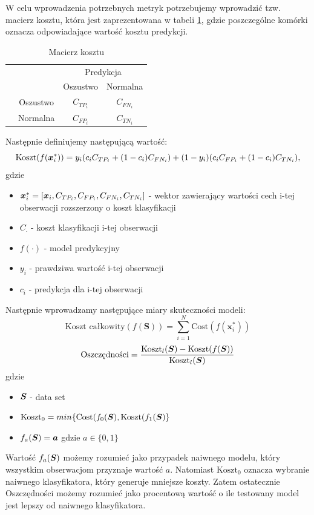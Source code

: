 \documentclass{book}
\begin{document}
	W celu wprowadzenia potrzebnych metryk potrzebujemy wprowadzić tzw. macierz kosztu, która jest zaprezentowana w tabeli \ref{macierz-kosztu}, gdzie poszczególne komórki oznacza odpowiadające wartość kosztu predykcji. 
	\begin{table}[h]
		\begin{center}
			\makegapedcells
			\begin{tabular}{cc|cc}
				\multicolumn{2}{c}{}     &   \multicolumn{2}{c}{Predykcja} \\
				&            &   Oszustwo &   Normalna     \\ 
				\cline{2-4}
				\multirow{2}{*}{\rotatebox[origin=c]{90}{Prawda}} & Oszustwo   & $C_{TP_{i}}$         & $C_{FN_{i}}$              \\
				& Normalna   & $C_{FP_{i}}$         & $C_{TN_{i}}$              \\ 
				\cline{2-4}
			\end{tabular}
		\end{center}
		\caption{Macierz kosztu}
		\label{macierz-kosztu}
	\end{table}
	Następnie definiujemy następującą wartość:
	$$ \text{Koszt}(f(\boldsymbol{x}_{i}^{*})) = y_i (c_i C_{TP_i} + (1-c_i)C_{FN_i}) + (1-y_i)(c_i C_{FP_i} + (1-c_i)C_{TN_i}) \text{,}$$
	gdzie 
	\begin{itemize}
		\item $\boldsymbol{x}_{i}^{*} = [\boldsymbol{x}_i, C_{TP_{i}}, C_{FP_{i}}, C_{FN_{i}}, C_{TN_{i}}]$ - wektor zawierający wartości cech i-tej obserwacji rozszerzony o koszt klasyfikacji
		\item $C_{\cdot}$ - koszt klasyfikacji i-tej obserwacji
		\item $f(\cdot)$ - model predykcyjny
		\item $y_i$ - prawdziwa wartość i-tej obserwacji
		\item $c_i$ - predykcja dla i-tej obserwacji
	\end{itemize}{}
    Następnie wprowadzamy następujące miary skuteczności modeli:
	\begin{equation}
		\label{koszt-calkowity}
		\text{Koszt całkowity}(f(\boldsymbol{S})) = \sum_{i=1}^{N}\text{Cost}(f(\boldsymbol{x}_{i}^{*}))
	\end{equation} 
	\begin{equation}
		\text{Oszczędności} = \frac{\text{Koszt}_{l}(\boldsymbol{S}) - \text{Koszt}(f(\boldsymbol{S}))}{\text{Koszt}_{l}(\boldsymbol{S})}
	\end{equation}
	gdzie
	\begin{itemize}
		\item $ \boldsymbol{S} $ - data set
		\item $ \text{Koszt}_0 = min\{\text{Cost}(f_{0}(\boldsymbol{S}), \text{Koszt}(f_{1}(\boldsymbol{S})\} $
		\item $ f_{a}(\boldsymbol{S}) = \boldsymbol{a} $ gdzie $a \in \{0,1\}$
	\end{itemize}{}
	Wartość $ f_{a}(\boldsymbol{S})$ możemy rozumieć jako przypadek naiwnego modelu, który wszystkim obserwacjom przyznaje wartość $a$. Natomiast $ \text{Koszt}_0 $ oznacza wybranie naiwnego klasyfikatora, który generuje mniejsze koszty. Zatem ostatecznie Oszczędności możemy rozumieć jako procentową wartość o ile testowany model jest lepszy od naiwnego klasyfikatora.
	
\end{document}

